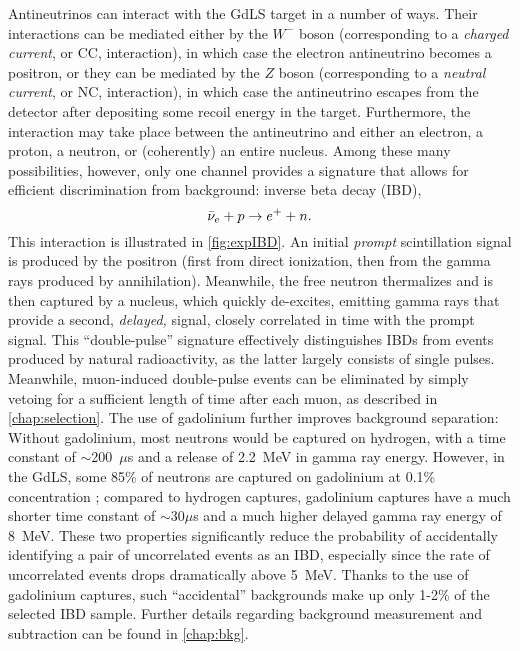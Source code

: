\documentclass[../thesis.tex]{subfiles}
\begin{document}
Antineutrinos can interact with the GdLS target in a number of ways. Their interactions can be mediated either by the $W^-$ boson (corresponding to a \emph{charged current}, or CC, interaction), in which case the electron antineutrino becomes a positron, or they can be mediated by the $Z$ boson (corresponding to a \emph{neutral current}, or NC, interaction), in which case the antineutrino escapes from the detector after depositing some recoil energy in the target. Furthermore, the interaction may take place between the antineutrino and either an electron, a proton, a neutron, or (coherently) an entire nucleus. Among these many possibilities, however, only one channel provides a signature that allows for efficient discrimination from background: inverse beta decay (IBD),
\begin{equation}
  \bar\nu_e + p \rightarrow e^+ + n.
\end{equation}
This interaction is illustrated in \autoref{fig:expIBD}. An initial \emph{prompt} scintillation signal is produced by the positron (first from direct ionization, then from the gamma rays produced by annihilation). Meanwhile, the free neutron thermalizes and is then captured by a nucleus, which quickly de-excites, emitting gamma rays that provide a second, \emph{delayed,} signal, closely correlated in time with the prompt signal. This ``double-pulse'' signature effectively distinguishes IBDs from events produced by natural radioactivity, as the latter largely consists of single pulses. Meanwhile, muon-induced double-pulse events can be eliminated by simply vetoing for a sufficient length of time after each muon, as described in \autoref{chap:selection}. The use of gadolinium further improves background separation: Without gadolinium, most neutrons would be captured on hydrogen, with a time constant of $\sim$200~$\mu$s and a release of 2.2~MeV in gamma ray energy. However, in the GdLS, some 85\% of neutrons are captured on gadolinium at 0.1\% concentration \cite{spectrum2017}; compared to hydrogen captures, gadolinium captures have a much shorter time constant of $\sim$30$\mu$s and a much higher delayed gamma ray energy of 8~MeV. These two properties significantly reduce the probability of accidentally identifying a pair of uncorrelated events as an IBD, especially since the rate of uncorrelated events drops dramatically above 5~MeV. Thanks to the use of gadolinium captures, such ``accidental'' backgrounds make up only 1-2\% of the selected IBD sample. Further details regarding background measurement and subtraction can be found in \autoref{chap:bkg}.
\end{document}
